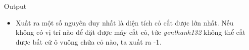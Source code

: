 Output
\begin{itemize}
	\item     Xuất ra một số nguyên duy nhất là diện tích cỏ cắt được lớn nhất. Nếu không có vị trí nào để đặt được máy cắt cỏ, tức    \emph{     yenthanh132    }    không thể cắt được bất cứ ô vuông chứa cỏ nào, ta xuất ra -1.   
\end{itemize}